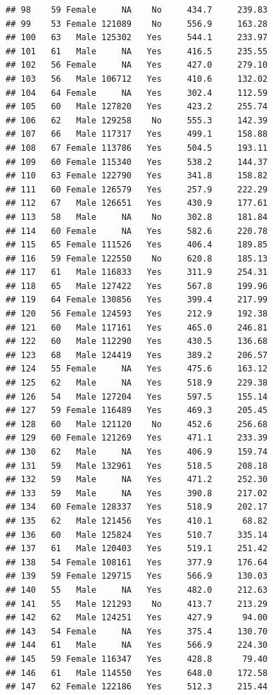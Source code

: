 \documentclass[12pt,]{krantz}
\theoremstyle{definition}
\theoremstyle{definition}
\theoremstyle{remark}
\begin{document}
\begin{verbatim}
## 98    59 Female     NA    No     434.7     239.83
## 99    53 Female 121089    No     556.9     163.28
## 100   63   Male 125302   Yes     544.1     233.97
## 101   61   Male     NA   Yes     416.5     235.55
## 102   56 Female     NA   Yes     427.0     279.10
## 103   56   Male 106712   Yes     410.6     132.02
## 104   64 Female     NA   Yes     302.4     112.59
## 105   60   Male 127820   Yes     423.2     255.74
## 106   62   Male 129258    No     555.3     142.39
## 107   66   Male 117317   Yes     499.1     158.88
## 108   67 Female 113786   Yes     504.5     193.11
## 109   60 Female 115340   Yes     538.2     144.37
## 110   63 Female 122790   Yes     341.8     158.82
## 111   60 Female 126579   Yes     257.9     222.29
## 112   67   Male 126651   Yes     430.9     177.61
## 113   58   Male     NA    No     302.8     181.84
## 114   60 Female     NA   Yes     582.6     220.78
## 115   65 Female 111526   Yes     406.4     189.85
## 116   59 Female 122550    No     620.8     185.13
## 117   61   Male 116833   Yes     311.9     254.31
## 118   65   Male 127422   Yes     567.8     199.96
## 119   64 Female 130856   Yes     399.4     217.99
## 120   56 Female 124593   Yes     212.9     192.38
## 121   60   Male 117161   Yes     465.0     246.81
## 122   60   Male 112290   Yes     430.5     136.68
## 123   68   Male 124419   Yes     389.2     206.57
## 124   55 Female     NA   Yes     475.6     163.12
## 125   62   Male     NA   Yes     518.9     229.38
## 126   54   Male 127204   Yes     597.5     155.14
## 127   59 Female 116489   Yes     469.3     205.45
## 128   60   Male 121120    No     452.6     256.68
## 129   60 Female 121269   Yes     471.1     233.39
## 130   62   Male     NA   Yes     406.9     159.74
## 131   59   Male 132961   Yes     518.5     208.18
## 132   59   Male     NA   Yes     471.2     252.30
## 133   59   Male     NA   Yes     390.8     217.02
## 134   60 Female 128337   Yes     518.9     202.17
## 135   62   Male 121456   Yes     410.1      68.82
## 136   60   Male 125824   Yes     510.7     335.14
## 137   61   Male 120403   Yes     519.1     251.42
## 138   54 Female 108161   Yes     377.9     176.64
## 139   59 Female 129715   Yes     566.9     130.03
## 140   55   Male     NA   Yes     482.0     212.63
## 141   55   Male 121293    No     413.7     213.29
## 142   62   Male 124251   Yes     427.9      94.00
## 143   54 Female     NA   Yes     375.4     130.70
## 144   61   Male     NA   Yes     566.9     224.30
## 145   59 Female 116347   Yes     428.8      79.40
## 146   61   Male 114550   Yes     648.0     172.58
## 147   62 Female 122186   Yes     512.3     215.44

\end{verbatim}
\end{document}
